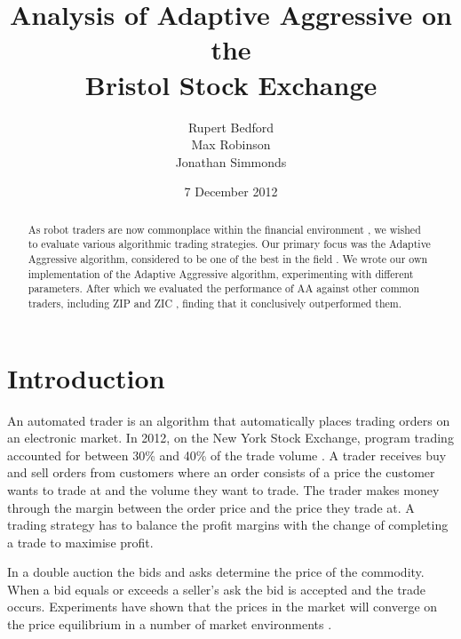 \documentclass[preprint]{acm_proc_article-sp} %
\begin{document}
\title{Analysis of Adaptive Aggressive on the\\
Bristol Stock Exchange}
\author{
  \alignauthor
    Rupert Bedford\\
  \alignauthor
    Max Robinson\\
  \alignauthor
    Jonathan Simmonds
}
\date{7 December 2012}

\maketitle
\begin{abstract}
As robot traders are now commonplace within the financial environment
\cite{nyse_press}, we wished to evaluate various algorithmic trading
strategies. Our primary focus was the  Adaptive Aggressive algorithm,
considered to be one of the best in the field \cite{AA_thesis}. We wrote our
own implementation of the Adaptive Aggressive algorithm, experimenting with
different parameters. After which we evaluated the performance of AA
against other common traders, including ZIP and ZIC \cite{ZIP_paper1}, finding
that it conclusively outperformed them.\\
\end{abstract}

\section{Introduction} \label{sec:introduction}

An automated trader is an algorithm that automatically places trading orders on
an electronic market. In 2012, on the New York Stock Exchange, program trading
accounted for between 30\% and 40\% of the trade volume \cite{nyse_press}.  A
trader receives buy and sell orders from customers where an order consists of a
price the customer wants to trade at and the volume they want to trade.  The
trader makes money through the margin between the order price and the price
they trade at.  A trading strategy has to balance the profit margins with the
change of completing a trade to maximise profit.

In a double auction the bids and asks determine the price of the commodity.
When a bid equals or exceeds a seller's ask the bid is accepted and the trade
occurs. Experiments have shown  that the prices in the market will
 converge on the price equilibrium in a number of market
environments \cite{smith_1962}.
\end{document}
